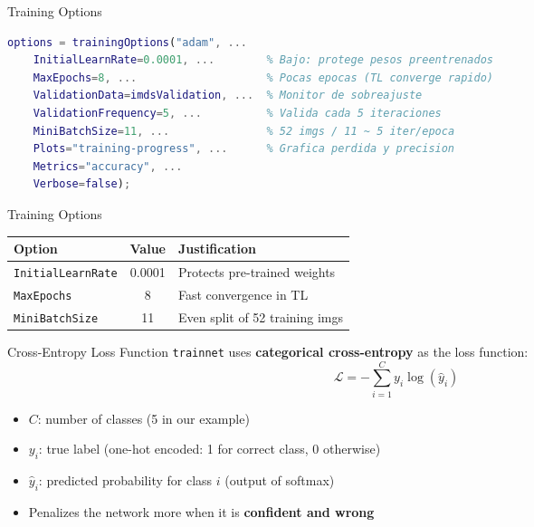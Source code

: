 \documentclass[aspectratio=169,xcolor=dvipsnames]{beamer}
\begin{document}
\begin{frame}[fragile]{Training Options}
\begin{lstlisting}[language=Matlab, style=MATLABStyle]
%% 4. OPCIONES DE ENTRENAMIENTO
options = trainingOptions("adam", ...
    InitialLearnRate=0.0001, ...        % Bajo: protege pesos preentrenados
    MaxEpochs=8, ...                    % Pocas epocas (TL converge rapido)
    ValidationData=imdsValidation, ...  % Monitor de sobreajuste
    ValidationFrequency=5, ...          % Valida cada 5 iteraciones
    MiniBatchSize=11, ...               % 52 imgs / 11 ~ 5 iter/epoca
    Plots="training-progress", ...      % Grafica perdida y precision
    Metrics="accuracy", ...
    Verbose=false);
\end{lstlisting}
\end{frame}
\begin{frame}[fragile]{Training Options}

    \begin{tabular}{lcl}
        \toprule
        \textbf{Option} & \textbf{Value} & \textbf{Justification} \\
        \midrule
        \texttt{InitialLearnRate} & 0.0001 & Protects pre-trained weights \\
        \texttt{MaxEpochs}        & 8      & Fast convergence in TL \\
        \texttt{MiniBatchSize}    & 11     & Even split of 52 training imgs \\
        \bottomrule
    \end{tabular}
\end{frame}

\begin{frame}{Cross-Entropy Loss Function}
    \texttt{trainnet} uses \textbf{categorical cross-entropy} as the loss function:
    \begin{equation}
        \mathcal{L} = -\sum_{i=1}^{C} y_i \log(\hat{y}_i)
    \end{equation}
    \begin{itemize}
        \item $C$: number of classes (5 in our example)
        \item $y_i$: true label (one-hot encoded: 1 for correct class, 0 otherwise)
        \item $\hat{y}_i$: predicted probability for class $i$ (output of softmax)
        \item Penalizes the network more when it is \textbf{confident and wrong}
    \end{itemize}
    
\end{frame}
\end{document}
